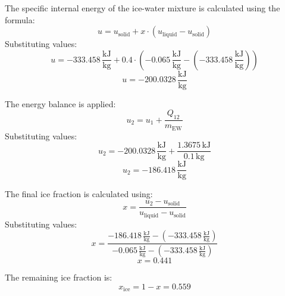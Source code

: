 The specific internal energy of the ice-water mixture is calculated using the formula:  
\[
u = u_{\text{solid}} + x \cdot (u_{\text{liquid}} - u_{\text{solid}})
\]  
Substituting values:  
\[
u = -333.458 \, \frac{\text{kJ}}{\text{kg}} + 0.4 \cdot (-0.065 \, \frac{\text{kJ}}{\text{kg}} - (-333.458 \, \frac{\text{kJ}}{\text{kg}}))
\]  
\[
u = -200.0328 \, \frac{\text{kJ}}{\text{kg}}
\]  

The energy balance is applied:  
\[
u_2 = u_1 + \frac{Q_{12}}{m_{\text{EW}}}
\]  
Substituting values:  
\[
u_2 = -200.0328 \, \frac{\text{kJ}}{\text{kg}} + \frac{1.3675 \, \text{kJ}}{0.1 \, \text{kg}}
\]  
\[
u_2 = -186.418 \, \frac{\text{kJ}}{\text{kg}}
\]  

The final ice fraction is calculated using:  
\[
x = \frac{u_2 - u_{\text{solid}}}{u_{\text{liquid}} - u_{\text{solid}}}
\]  
Substituting values:  
\[
x = \frac{-186.418 \, \frac{\text{kJ}}{\text{kg}} - (-333.458 \, \frac{\text{kJ}}{\text{kg}})}{-0.065 \, \frac{\text{kJ}}{\text{kg}} - (-333.458 \, \frac{\text{kJ}}{\text{kg}})}
\]  
\[
x = 0.441
\]  

The remaining ice fraction is:  
\[
x_{\text{ice}} = 1 - x = 0.559
\]